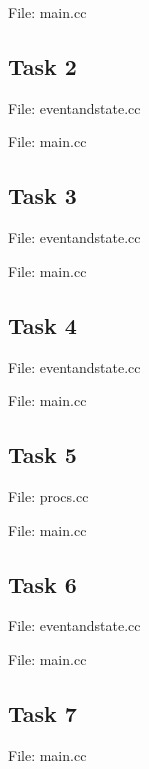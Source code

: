 \documentclass[]{article}
\begin{document}
{\large File: main.cc}


\subsection{Task 2}
{\large File: eventandstate.cc}


{\large File: main.cc}


\subsection{Task 3}
{\large File: eventandstate.cc}


{\large File: main.cc}


\subsection{Task 4}
{\large File: eventandstate.cc}


{\large File: main.cc}


\subsection{Task 5}
{\large File: procs.cc}


{\large File: main.cc}


\subsection{Task 6}
{\large File: eventandstate.cc}


{\large File: main.cc}


\subsection{Task 7}
{\large File: main.cc}



 
\end{document}
